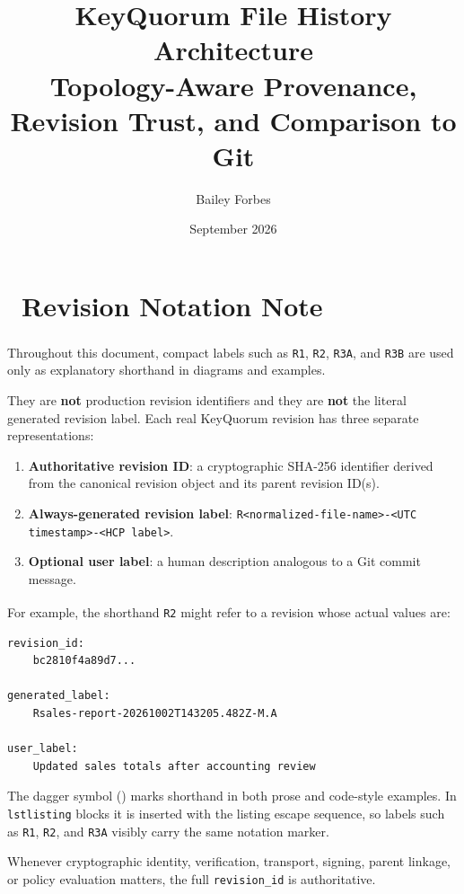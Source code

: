 \documentclass[11pt]{article}
\title{KeyQuorum File History Architecture\\\large Topology-Aware Provenance, Revision Trust, and Comparison to Git}
\author{Bailey Forbes}
\date{September 2026}
\newcommand{\revshort}[1]{\texttt{#1}\textsuperscript{\textcolor{revisionnote}{\dag}}}
\begin{document}
\maketitle
\tableofcontents
\newpage

\section*{\textcolor{revisionnote}{\dag\ Revision Notation Note}}

Throughout this document, compact labels such as \revshort{R1}, \revshort{R2}, \revshort{R3A}, and \revshort{R3B} are used only as explanatory shorthand in diagrams and examples.

They are \textbf{not} production revision identifiers and they are \textbf{not} the literal generated revision label. Each real KeyQuorum revision has three separate representations:

\begin{enumerate}[leftmargin=1.8em]
  \item \textbf{Authoritative revision ID}: a cryptographic SHA-256 identifier derived from the canonical revision object and its parent revision ID(s).
  \item \textbf{Always-generated revision label}: \texttt{R<normalized-file-name>-<UTC timestamp>-<HCP label>}.
  \item \textbf{Optional user label}: a human description analogous to a Git commit message.
\end{enumerate}

For example, the shorthand \revshort{R2} might refer to a revision whose actual values are:

\begin{lstlisting}
revision_id:
    bc2810f4a89d7...

generated_label:
    Rsales-report-20261002T143205.482Z-M.A

user_label:
    Updated sales totals after accounting review
\end{lstlisting}

The dagger symbol (\textcolor{revisionnote}{\dag}) marks shorthand in both prose and code-style examples. In \texttt{lstlisting} blocks it is inserted with the listing escape sequence, so labels such as \texttt{R1}, \texttt{R2}, and \texttt{R3A} visibly carry the same notation marker.

Whenever cryptographic identity, verification, transport, signing, parent linkage, or policy evaluation matters, the full \texttt{revision\_id} is authoritative.
\end{document}
